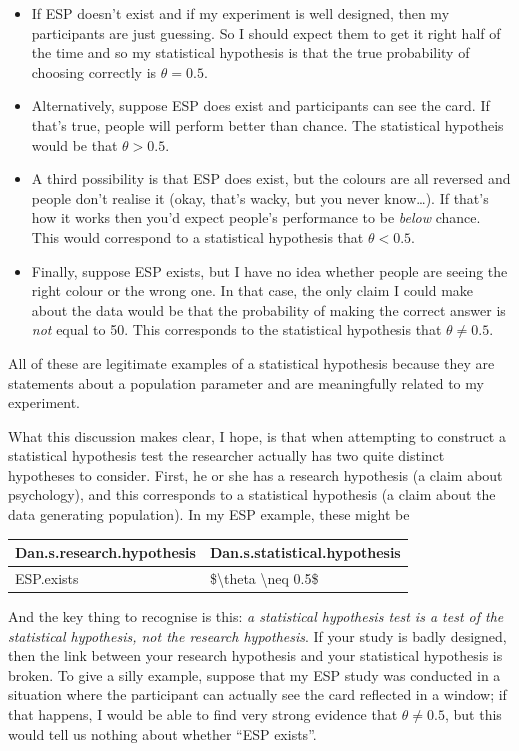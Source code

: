 \documentclass[
]{book}
\providecommand{\tightlist}{%
  \setlength{\itemsep}{0pt}\setlength{\parskip}{0pt}}
\begin{document}
\begin{itemize}
\tightlist
\item
  If ESP doesn't exist and if my experiment is well designed, then my participants are just guessing. So I should expect them to get it right half of the time and so my statistical hypothesis is that the true probability of choosing correctly is \(\theta = 0.5\).
\item
  Alternatively, suppose ESP does exist and participants can see the card. If that's true, people will perform better than chance. The statistical hypotheis would be that \(\theta > 0.5\).
\item
  A third possibility is that ESP does exist, but the colours are all reversed and people don't realise it (okay, that's wacky, but you never know\ldots). If that's how it works then you'd expect people's performance to be \emph{below} chance. This would correspond to a statistical hypothesis that \(\theta < 0.5\).
\item
  Finally, suppose ESP exists, but I have no idea whether people are seeing the right colour or the wrong one. In that case, the only claim I could make about the data would be that the probability of making the correct answer is \emph{not} equal to 50. This corresponds to the statistical hypothesis that \(\theta \neq 0.5\).
\end{itemize}

All of these are legitimate examples of a statistical hypothesis because they are statements about a population parameter and are meaningfully related to my experiment.

What this discussion makes clear, I hope, is that when attempting to construct a statistical hypothesis test the researcher actually has two quite distinct hypotheses to consider. First, he or she has a research hypothesis (a claim about psychology), and this corresponds to a statistical hypothesis (a claim about the data generating population). In my ESP example, these might be

\begin{tabular}{l|l}
\hline
Dan.s.research.hypothesis & Dan.s.statistical.hypothesis\\
\hline
ESP.exists & \$\textbackslash{}theta \textbackslash{}neq 0.5\$\\
\hline
\end{tabular}

And the key thing to recognise is this: \emph{a statistical hypothesis test is a test of the statistical hypothesis, not the research hypothesis}. If your study is badly designed, then the link between your research hypothesis and your statistical hypothesis is broken. To give a silly example, suppose that my ESP study was conducted in a situation where the participant can actually see the card reflected in a window; if that happens, I would be able to find very strong evidence that \(\theta \neq 0.5\), but this would tell us nothing about whether ``ESP exists''.
\end{document}
